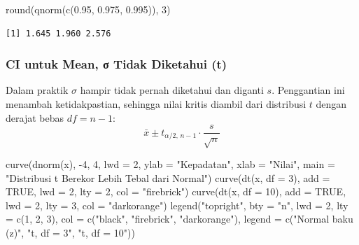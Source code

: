 \documentclass[
  indonesian,
  letterpaper,
]{book}
\newenvironment{Shaded}{\begin{snugshade}}{\end{snugshade}}
\newcommand{\AttributeTok}[1]{\textcolor[rgb]{0.40,0.45,0.13}{#1}}
\newcommand{\ConstantTok}[1]{\textcolor[rgb]{0.56,0.35,0.01}{#1}}
\newcommand{\DecValTok}[1]{\textcolor[rgb]{0.68,0.00,0.00}{#1}}
\newcommand{\FloatTok}[1]{\textcolor[rgb]{0.68,0.00,0.00}{#1}}
\newcommand{\FunctionTok}[1]{\textcolor[rgb]{0.28,0.35,0.67}{#1}}
\newcommand{\NormalTok}[1]{\textcolor[rgb]{0.00,0.23,0.31}{#1}}
\newcommand{\SpecialCharTok}[1]{\textcolor[rgb]{0.37,0.37,0.37}{#1}}
\newcommand{\StringTok}[1]{\textcolor[rgb]{0.13,0.47,0.30}{#1}}
\begin{document}
\begin{Shaded}
\begin{Highlighting}[]
\FunctionTok{round}\NormalTok{(}\FunctionTok{qnorm}\NormalTok{(}\FunctionTok{c}\NormalTok{(}\FloatTok{0.95}\NormalTok{, }\FloatTok{0.975}\NormalTok{, }\FloatTok{0.995}\NormalTok{)), }\DecValTok{3}\NormalTok{)}
\end{Highlighting}
\end{Shaded}

\begin{verbatim}
[1] 1.645 1.960 2.576
\end{verbatim}

\subsubsection{CI untuk Mean, σ Tidak Diketahui
(t)}\label{ci-untuk-mean-ux3c3-tidak-diketahui-t}

Dalam praktik \(\sigma\) hampir tidak pernah diketahui dan diganti
\(s\). Penggantian ini menambah ketidakpastian, sehingga nilai kritis
diambil dari distribusi \(t\) dengan derajat bebas \(df = n-1\):
\[\bar{x} \pm t_{\alpha/2,\, n-1} \cdot \frac{s}{\sqrt{n}}\]

\begin{Shaded}
\begin{Highlighting}[]
\FunctionTok{curve}\NormalTok{(}\FunctionTok{dnorm}\NormalTok{(x), }\SpecialCharTok{{-}}\DecValTok{4}\NormalTok{, }\DecValTok{4}\NormalTok{, }\AttributeTok{lwd =} \DecValTok{2}\NormalTok{, }\AttributeTok{ylab =} \StringTok{"Kepadatan"}\NormalTok{, }\AttributeTok{xlab =} \StringTok{"Nilai"}\NormalTok{,}
\AttributeTok{main =} \StringTok{"Distribusi t Berekor Lebih Tebal dari Normal"}\NormalTok{)}
\FunctionTok{curve}\NormalTok{(}\FunctionTok{dt}\NormalTok{(x, }\AttributeTok{df =} \DecValTok{3}\NormalTok{), }\AttributeTok{add =} \ConstantTok{TRUE}\NormalTok{, }\AttributeTok{lwd =} \DecValTok{2}\NormalTok{, }\AttributeTok{lty =} \DecValTok{2}\NormalTok{, }\AttributeTok{col =} \StringTok{"firebrick"}\NormalTok{)}
\FunctionTok{curve}\NormalTok{(}\FunctionTok{dt}\NormalTok{(x, }\AttributeTok{df =} \DecValTok{10}\NormalTok{), }\AttributeTok{add =} \ConstantTok{TRUE}\NormalTok{, }\AttributeTok{lwd =} \DecValTok{2}\NormalTok{, }\AttributeTok{lty =} \DecValTok{3}\NormalTok{, }\AttributeTok{col =} \StringTok{"darkorange"}\NormalTok{)}
\FunctionTok{legend}\NormalTok{(}\StringTok{"topright"}\NormalTok{, }\AttributeTok{bty =} \StringTok{"n"}\NormalTok{, }\AttributeTok{lwd =} \DecValTok{2}\NormalTok{, }\AttributeTok{lty =} \FunctionTok{c}\NormalTok{(}\DecValTok{1}\NormalTok{, }\DecValTok{2}\NormalTok{, }\DecValTok{3}\NormalTok{), }\AttributeTok{col =} \FunctionTok{c}\NormalTok{(}\StringTok{"black"}\NormalTok{,}
\StringTok{"firebrick"}\NormalTok{, }\StringTok{"darkorange"}\NormalTok{),}
\AttributeTok{legend =} \FunctionTok{c}\NormalTok{(}\StringTok{"Normal baku (z)"}\NormalTok{, }\StringTok{"t, df = 3"}\NormalTok{, }\StringTok{"t, df = 10"}\NormalTok{))}
\end{Highlighting}
\end{Shaded}
\end{document}
